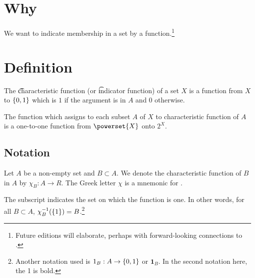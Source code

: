 

\section*{Why}

We want to indicate membership in a set by a function.\footnote{Future editions will elaborate, perhaps with forward-looking connections to .}

\section*{Definition}

The \t{characteristic function} (or \t{indicator function}) of a set $X$ is a function from $X$ to $\{0,1\}$ which is $1$ if the argument is in $A$ and 0 otherwise.

The function which assigns to each subset $A$ of $X$ to characteristic function of $A$ is a one-to-one function from $\powerset{X}$ onto $2^{X}$.

\subsection*{Notation}

Let $A$ be a non-empty set and $B \subset A$.
We denote the characteristic function of $B$ in $A$ by $\chi _{B}: A \to R$.
The Greek letter $\chi $ is a mnemonic for .

The subscript indicates the set on which the function is one.
In other words, for all $B \subset A$, $\chi _{B}^{-1}(\{1\}) = B$.\footnote{Another notation used is $1_{B}: A \to \{0, 1\}$ or $\mathbf{1}_B$.
In the second notation here, the 1 is bold.}

\blankpage